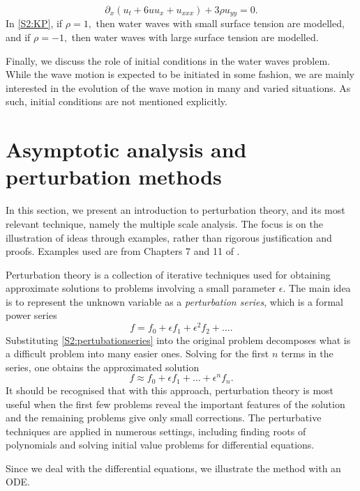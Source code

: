 \begin{itemize}
\begin{equation}\label{S2:KP}
\partial_x(u_t + 6uu_x + u_{xxx}) + 3 \rho u_{yy} = 0.
\end{equation}
In \eqref{S2:KP}, if $\rho = 1,$ then water waves with small surface tension are modelled, and if $\rho = -1,$ then water waves with large surface tension are modelled.
\end{itemize}
Finally, we discuss the role of initial conditions in the water waves problem. While the wave motion is expected to be initiated in some fashion, we are mainly interested in the evolution of the wave motion in many and varied situations. As such, initial conditions are not mentioned explicitly. 

\section{Asymptotic analysis and perturbation methods}
In this section, we present an introduction to perturbation theory, and its most relevant technique, namely the multiple scale analysis. The focus is on the illustration of ideas through examples, rather than rigorous justification and proofs. Examples used are from Chapters 7 and 11 of \cite{BO}.

Perturbation theory is a collection of iterative techniques used for obtaining approximate solutions to problems involving a small parameter $\epsilon$. The main idea is to represent the unknown variable as a \textit{perturbation series}, which is a formal power series 
\begin{equation}\label{S2:pertubationseries}
f = f_0 + \epsilon f_1 + \epsilon^2 f_2 + \ldots.
\end{equation} 
Substituting \eqref{S2:pertubationseries} into the original problem decomposes what is a difficult problem  into many easier ones. Solving for the first $n$ terms in the series, one obtains the approximated solution 
\[f \approx f_0 + \epsilon f_1 + \ldots + \epsilon^n f_n.\]
It should be recognised that with this approach, perturbation theory is most useful when the first few problems reveal the important features of the solution and the remaining problems give only small corrections. The perturbative techniques are applied in numerous settings, including finding roots of polynomials and solving initial value problems for differential equations.

Since we deal with the differential equations, we illustrate the method with an ODE.

\label{S2:example}


